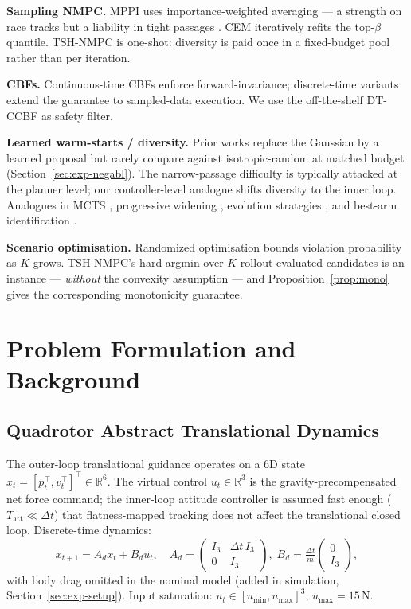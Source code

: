 \documentclass[11pt,onecolumn,a4paper]{article}
\newcommand{\R}{\mathbb{R}}
\newcommand{\dt}{\Delta t}
\begin{document}
\textbf{Sampling NMPC.} MPPI \cite{WIL17,WIL18} uses
importance-weighted averaging --- a strength on race tracks but a
liability in tight passages \cite{SUN22,GAN21}. CEM \cite{BOT13,RUB04}
iteratively refits the top-$\beta$ quantile. TSH-NMPC is one-shot:
diversity is paid once in a fixed-budget pool rather than per iteration.

\textbf{CBFs.} Continuous-time CBFs \cite{AME17} enforce
forward-invariance; discrete-time variants \cite{WAN17} extend the
guarantee to sampled-data execution. We use the off-the-shelf
DT-CCBF as safety filter.

\textbf{Learned warm-starts / diversity.} Prior works replace the
Gaussian by a learned proposal \cite{PAN17,KAH18,OKA20,JAN22} but
rarely compare against isotropic-random at matched budget
(Section~\ref{sec:exp-negabl}). The narrow-passage difficulty
\cite{HSU03,SUN05} is typically attacked at the planner level;
our controller-level analogue shifts diversity to the inner loop.
Analogues in MCTS \cite{KOC06}, progressive widening \cite{COU11},
evolution strategies \cite{HAN01,SAL17}, and best-arm identification
\cite{AUD10}.

\textbf{Scenario optimisation.} Randomized optimisation
\cite{CAM08,CAM18} bounds violation probability as $K$ grows.
TSH-NMPC's hard-argmin over $K$ rollout-evaluated candidates is an
instance --- \emph{without} the convexity assumption --- and
Proposition~\ref{prop:mono} gives the corresponding monotonicity
guarantee.

\section{Problem Formulation and Background}\label{sec:problem}

\subsection{Quadrotor Abstract Translational Dynamics}

The outer-loop translational guidance operates on a 6D state
$x_t = [p_t^\top, v_t^\top]^\top \in \R^6$. The virtual control
$u_t \in \R^3$ is the gravity-precompensated net force command; the
inner-loop attitude controller is assumed fast enough
($T_{\mathrm{att}} \ll \dt$) that flatness-mapped tracking does not
affect the translational closed loop. Discrete-time dynamics:
\begin{equation}\label{eq:dyn}
x_{t+1} = A_d x_t + B_d u_t,\quad
A_d = \begin{pmatrix} I_3 & \dt\, I_3 \\ 0 & I_3 \end{pmatrix},\;
B_d = \tfrac{\dt}{m} \begin{pmatrix} 0 \\ I_3 \end{pmatrix},
\end{equation}
with body drag omitted in the nominal model (added in simulation,
Section~\ref{sec:exp-setup}). Input saturation:
$u_t \in [u_{\min}, u_{\max}]^3$, $u_{\max} = 15\,\mathrm{N}$.
\end{document}
